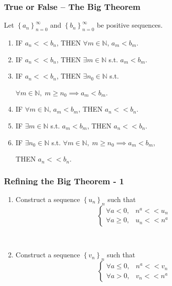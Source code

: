 \documentclass[14pt]{beamer}
\newcommand {\DS} [1] {${\displaystyle #1}$}
\newcommand {\N}{\mathbb{N}}
\newcommand{\p}{\pause}
\newcommand{\azul}[1]{{\color{blue} #1}}
\newcommand{\rojo}[1]{{\color{red} #1}}
\newcommand{\setsize}[1]{\fontsize{#1}{#1}\selectfont} %
\newcommand{\smallerfont}{\setsize{13}} %
\newcommand{\an}{\left\{ a_n \right\}_{n=0}^{\infty}}
\newcommand{\bn}{\left\{ b_n \right\}_{n=0}^{\infty}}
\newcommand{\seqs}[1]{\left\{ #1_n \right\}_{n}}
\begin{document}
\begin{frame}[t]
\smallerfont
\frametitle{True or False -- The Big Theorem}

Let \DS{\an} and \DS{\bn} be positive sequences.
\vspace{.15cm}
\begin{enumerate}
	\item   IF \; \rojo{\DS{a_n << b_n}}, \quad THEN  \; \azul{\DS{\forall m \in \N}, \DS{a_m < b_m}}.
\vfill
	\item   IF \; \rojo{\DS{a_n << b_n}}, \quad THEN  \; \azul{\DS{\exists m \in \N} s.t. \DS{a_m < b_m}}.
\vfill
	\item   IF \; \rojo{\DS{a_n << b_n}}, \quad THEN  \; \azul{\DS{\exists n_0 \in \N} s.t.} 
		\vspace{.15cm}
		
		\azul{ \DS{\forall m \in \N, \; m\geq n_0 \implies a_m < b_m}}.
\vfill
\p
	\item   IF \; \azul{\DS{\forall m \in \N, \, a_m < b_m}},  \quad THEN \; \rojo{\DS{a_n << b_n}}.
\vfill
	\item   IF \; \azul{\DS{\exists m \in \N} s.t.  \DS{a_m < b_m}},  \quad THEN \; \rojo{\DS{a_n << b_n}}.
\vfill
	\item   IF \; \azul{\DS{\exists n_0 \in \N} s.t. \DS{\forall m \in \N, \; m\geq n_0 \implies a_m < b_m}},  
		\vspace{.15cm}
		
		THEN \; \rojo{\DS{a_n << b_n}}.
\vfill
\end{enumerate}

\end{frame}
\begin{frame}[t]
\frametitle{Refining the Big Theorem - 1}

\begin{enumerate}
	\item  Construct a sequence \DS{\seqs{u}} such that
  		$$
			\begin{cases}
				\forall a < 0, & n^a << u_n  \\
				\forall a \geq 0, & u_n << n^a
			\end{cases}
		$$

\

	\item  Construct a sequence \DS{\seqs{v}} such that
  		$$
			\begin{cases}
				\forall a \leq 0, & n^a << v_n  \\
				\forall a > 0, & v_n << n^a
			\end{cases}
		$$
\end{enumerate}   

\end{frame}
\end{document}
